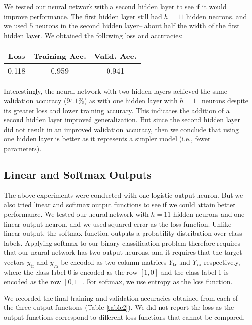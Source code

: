 \documentclass[12pt]{article}
\newcommand{\ytr}{y_{\mbox{tr}}}
\newcommand{\Ytr}{Y_{\mbox{tr}}}
\newcommand{\yva}{y_{\mbox{va}}}
\newcommand{\Yva}{Y_{\mbox{va}}}
\begin{document}
We tested our neural network with a second hidden layer to see if it would improve performance. The first hidden layer still had $h=11$ hidden neurons, and we used $5$ neurons in the second hidden layer-- about half the width of the first hidden layer. We obtained the following loss and accuracies:

\begin{center}
\begin{tabular}{|c|c|c|} \hline
Loss & Training Acc. & Valid. Acc. \\ \hline
0.118 & 0.959 & 0.941 \\
\hline
\end{tabular}
\end{center}

Interestingly, the neural network with two hidden layers achieved the same validation accuracy ($94.1\%$) as with one hidden layer with $h=11$ neurons despite its greater loss and lower training accuracy. This indicates the addition of a second hidden layer improved generalization. But since the second hidden layer did not result in an improved validation accuracy, then we conclude that using one hidden layer is better as it represents a simpler model (i.e., fewer parameters).


\subsection{Linear and Softmax Outputs}

The above experiments were conducted with one logistic output neuron. But we also tried linear and softmax output functions to see if we could attain better performance. We tested our neural network with $h=11$ hidden neurons and one linear output neuron, and we used squared error as the loss function. Unlike linear output, the softmax function outputs a probability distribution over class labels. Applying softmax to our binary classification problem therefore requires that our neural network has two output neurons, and it requires that the target vectors $\ytr$ and $\yva$ be encoded as two-column matrices $\Ytr$ and $\Yva$ respectively, where the class label 0 is encoded as the row $[1,0]$ and the class label 1 is encoded as the row $[0,1]$. For softmax, we use entropy as the loss function.

We recorded the final training and validation accuracies obtained from each of the three output functions (Table \ref{table2}). We did not report the loss as the output functions correspond to different loss functions that cannot be compared.
\end{document}
